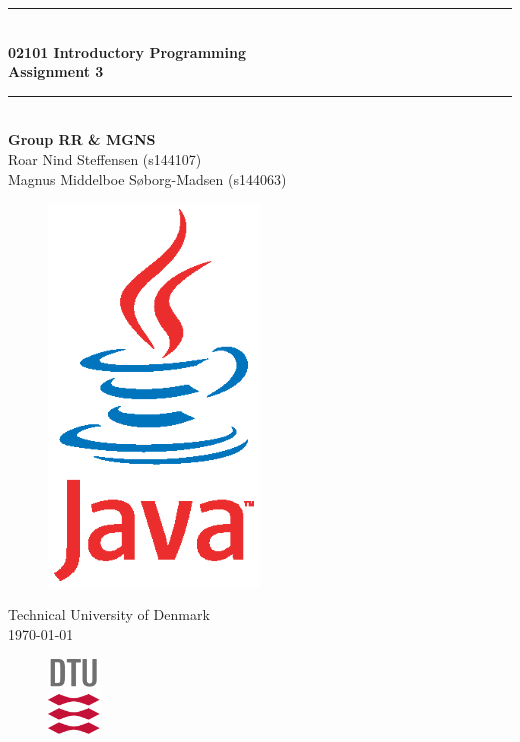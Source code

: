 \begin{titlepage}
\centering
\parindent=0pt
\newcommand{\HRule}{\rule{\textwidth}{1mm}}
 \HRule\\[1cm]\huge\textbf
{02101 Introductory Programming \\Assignment 3}\\[0.1cm]
\HRule\\[3cm]\vspace{-1 cm} \textbf{\Large{Group RR \& MGNS}}\\
\large{
Roar Nind Steffensen (s144107)\\
Magnus Middelboe Søborg-Madsen (s144063)}

\vspace{1 cm}

\begin{figure}[H]
\centering
\includegraphics[width=0.5\textwidth]{java.eps}
\label{fig:front}
\end{figure}

 \normalsize %
Technical University of Denmark\\
\today
\vspace{0.5cm}
\begin{figure}[h]
    \centering
    \includegraphics[height=2cm]{DTUlogo.png}
\end{figure}
\end{titlepage}